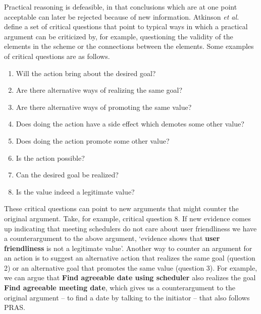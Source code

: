 Practical reasoning is defeasible, in that conclusions which are at one point acceptable can later be rejected because of new information. Atkinson \emph{et al.}~\cite{atkinson2007} define a set of critical questions that point to typical ways in which a practical argument can be criticized by, for example, questioning the validity of the elements in the scheme or the connections between the elements. Some examples of critical questions are as follows.

\begin{enumerate}
\item Will the action bring about the desired goal?
\item Are there alternative ways of realizing the same goal?
\item Are there alternative ways of promoting the same value?
\item Does doing the action have a side effect which demotes some other value?
\item Does doing the action promote some other value?
\item Is the action possible?
\item Can the desired goal be realized?
\item Is the value indeed a legitimate value?
\end{enumerate}

These critical questions can point to new arguments that might counter the original argument. Take, for example, critical question 8. If new evidence comes up indicating that meeting schedulers do not care about user friendliness we have a counterargument to the above argument, `evidence shows that \textbf{user friendliness} is not a legitimate value'. Another way to counter an argument for an action is to suggest an alternative action that realizes the same goal (question 2) or an alternative goal that promotes the same value (question 3). For example, we can argue that \textbf{Find agreeable date using scheduler} also realizes the goal \textbf{Find agreeable meeting date}, which gives us a counterargument to the original argument -- to find a date by talking to the initiator -- that also follows PRAS. 

